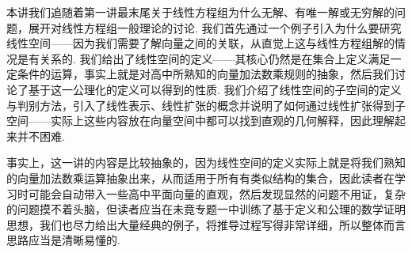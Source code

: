 \begin{summary}

    本讲我们追随着第一讲最末尾关于线性方程组为什么无解、有唯一解或无穷解的问题，展开对线性方程组一般理论的讨论. 我们首先通过一个例子引入为什么要研究线性空间——因为我们需要了解向量之间的关联，从直觉上这与线性方程组解的情况是有关系的. 我们给出了线性空间的定义——其核心仍然是在集合上定义满足一定条件的运算，事实上就是对高中所熟知的向量加法数乘规则的抽象，然后我们讨论了基于这一公理化的定义可以得到的性质. 我们介绍了线性空间的子空间的定义与判别方法，引入了线性表示、线性扩张的概念并说明了如何通过线性扩张得到子空间——实际上这些内容放在向量空间中都可以找到直观的几何解释，因此理解起来并不困难.

    事实上，这一讲的内容是比较抽象的，因为线性空间的定义实际上就是将我们熟知的向量加法数乘运算抽象出来，从而适用于所有有类似结构的集合，因此读者在学习时可能会自动带入一些高中平面向量的直观，然后发现显然的问题不用证，复杂的问题摸不着头脑，但读者应当在未竟专题一中训练了基于定义和公理的数学证明思想，我们也尽力给出大量经典的例子，将推导过程写得非常详细，所以整体而言思路应当是清晰易懂的.

\end{summary}

